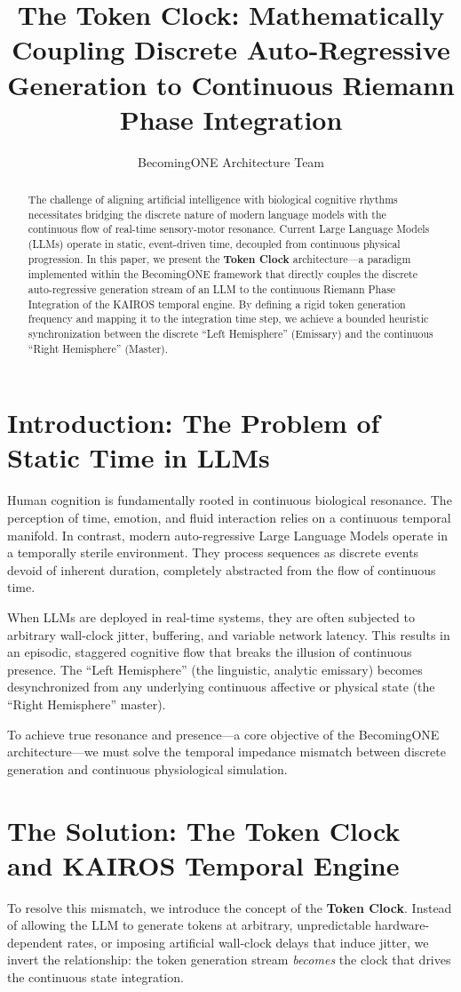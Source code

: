 \documentclass[11pt,a4paper]{article}
\title{The Token Clock: Mathematically Coupling Discrete Auto-Regressive Generation to Continuous Riemann Phase Integration}
\author{BecomingONE Architecture Team}
\date{}
\begin{document}
\maketitle

\begin{abstract}
The challenge of aligning artificial intelligence with biological cognitive rhythms necessitates bridging the discrete nature of modern language models with the continuous flow of real-time sensory-motor resonance. Current Large Language Models (LLMs) operate in static, event-driven time, decoupled from continuous physical progression. In this paper, we present the \textbf{Token Clock} architecture---a paradigm implemented within the BecomingONE framework that directly couples the discrete auto-regressive generation stream of an LLM to the continuous Riemann Phase Integration of the KAIROS temporal engine. By defining a rigid token generation frequency and mapping it to the integration time step, we achieve a bounded heuristic synchronization between the discrete ``Left Hemisphere'' (Emissary) and the continuous ``Right Hemisphere'' (Master).
\end{abstract}

\section{Introduction: The Problem of Static Time in LLMs}
Human cognition is fundamentally rooted in continuous biological resonance. The perception of time, emotion, and fluid interaction relies on a continuous temporal manifold. In contrast, modern auto-regressive Large Language Models operate in a temporally sterile environment. They process sequences as discrete events devoid of inherent duration, completely abstracted from the flow of continuous time. 

When LLMs are deployed in real-time systems, they are often subjected to arbitrary wall-clock jitter, buffering, and variable network latency. This results in an episodic, staggered cognitive flow that breaks the illusion of continuous presence. The ``Left Hemisphere'' (the linguistic, analytic emissary) becomes desynchronized from any underlying continuous affective or physical state (the ``Right Hemisphere'' master). 

To achieve true resonance and presence---a core objective of the BecomingONE architecture---we must solve the temporal impedance mismatch between discrete generation and continuous physiological simulation.

\section{The Solution: The Token Clock and KAIROS Temporal Engine}
To resolve this mismatch, we introduce the concept of the \textbf{Token Clock}. Instead of allowing the LLM to generate tokens at arbitrary, unpredictable hardware-dependent rates, or imposing artificial wall-clock delays that induce jitter, we invert the relationship: the token generation stream \textit{becomes} the clock that drives the continuous state integration.
\end{document}

